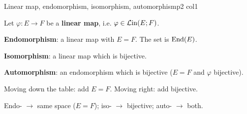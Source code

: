 \documentclass[sheet,noautoquant,noautokw]{neyvia-study}
\begin{document}
\begin{concept}[1.33]{Linear map, endomorphism, isomorphism, automorphism}{p2 col1}
\begin{definition}
\noindent Let $\varphi:E\to F$ be a \textbf{linear map}, i.e. $\varphi\in\mathcal{L}\mathrm{in}(E;F)$.
\par\noindent \textbf{Endomorphism}: a linear map with $E=F$. The set is $\operatorname{End}(E)$.
\par\noindent \textbf{Isomorphism}: a linear map which is bijective.
\par\noindent \textbf{Automorphism}: an endomorphism which is bijective ($E=F$ and $\varphi$ bijective).
\par\noindent Moving down the table: add $E=F$. Moving right: add bijective.
\end{definition}
\begin{reflex}
Endo- \ensuremath{\rightarrow} same space ($E=F$); iso- \ensuremath{\rightarrow} bijective; auto- \ensuremath{\rightarrow} both.
\end{reflex}
\end{concept}
\end{document}
